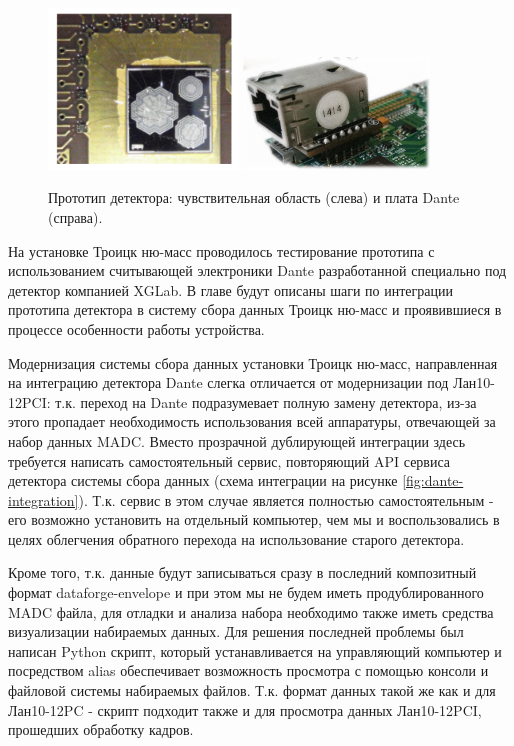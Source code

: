 \documentclass[a4paper,14pt]{extreport}
\begin{document}
\begin{figure}
  \centering
  \includegraphics[width = 0.45\textwidth]{img/dante/detector.png}
  \includegraphics[width = 0.44\textwidth]{img/dante/board.png}
    \caption{Прототип детектора: чувствительная область (слева) и плата Dante (справа).}
    \label{fig:dante-view}
\end{figure}

На установке Троицк ню-масс проводилось тестирование прототипа с использованием считывающей электроники Dante разработанной специально под детектор компанией XGLab. В главе будут описаны шаги по интеграции прототипа детектора в систему сбора данных Троицк ню-масс и проявившиеся в процессе особенности работы устройства.

Модернизация системы сбора данных установки Троицк ню-масс, направленная на интеграцию детектора Dante слегка отличается от модернизации под Лан10-12PCI: т.к. переход на Dante подразумевает полную замену детектора, из-за этого пропадает необходимость использования всей аппаратуры, отвечающей за набор данных MADC. Вместо прозрачной дублирующей интеграции здесь требуется написать самостоятельный сервис, повторяющий API сервиса детектора системы сбора данных (схема интеграции на рисунке \ref{fig:dante-integration}). Т.к. сервис в этом случае является полностью самостоятельным - его возможно установить на отдельный компьютер, чем мы и воспользовались в целях облегчения обратного перехода на использование старого детектора.

Кроме того, т.к. данные будут записываться сразу в последний композитный формат dataforge-envelope и при этом мы не будем иметь продублированного MADC файла, для отладки и анализа набора необходимо также иметь средства визуализации набираемых данных. Для решения последней проблемы был написан Python скрипт, который устанавливается на управляющий компьютер и посредством alias обеспечивает возможность просмотра с помощью консоли и файловой системы набираемых файлов. Т.к. формат данных такой же как и для Лан10-12PC - скрипт подходит также и для просмотра данных Лан10-12PCI, прошедших обработку кадров.
\end{document}
